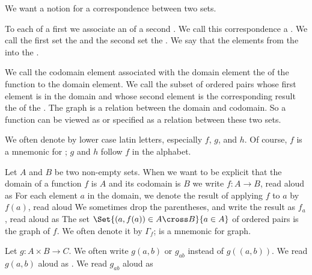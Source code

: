 
\sbasic




\sstart


We want a notion for a correspondence between two sets.


To each  of a first 
we associate an  of a second .
We call this correspondence a .
We call the first set the  and the second
set the .
We say that the   elements
from the  into the .

We call the codomain element associated with the domain element the
 of 
the function to the domain element.
We call the subset of ordered pairs whose first element is in the
domain and whose second element is the corresponding result the
 of the .
The graph is a relation between the domain and codomain.
So a function can be viewed as or specified as a relation between these two sets.

We often denote  by lower case latin letters, especially $f$, $g$, and $h$.
Of course, $f$ is a mnemonic for ; $g$ and $h$ follow $f$ in the alphabet.

Let $A$ and $B$ be two non-empty sets.
When we want to be explicit that the domain of a function $f$ is $A$ and its codomain is $B$ we write $f: A \to B$, read aloud as 
For each element $a$ in the domain, we denote the result of applying $f$ to $a$ by $f(a)$, read aloud 
We sometimes drop the parentheses, and write the result as $f_a$, read aloud as 
The set $\Set{(a, f(a)) \in A \cross B}{a \in A}$ of ordered pairs is the graph of $f$.
We often denote it by $\Gamma_f$;  is a mnemonic for graph.

Let $g: A \times B \to C$.
We often write $g(a,b)$ or $g_{ab}$ instead of $g((a,b))$. We read $g(a, b)$ aloud as .
We read $g_{ab}$ aloud as 


